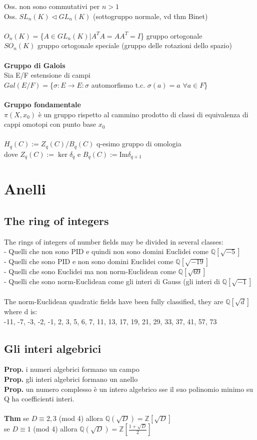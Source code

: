 \documentclass[10pt,a4paper]{article}
\begin{document}
Oss. non sono commutativi per $n>1$\\
Oss. $SL_n(K) \lhd GL_n(K)$ (sottogruppo normale, vd thm Binet)\\\\
$ O_n(K) = $\{$A \in GL_n(K) | A^TA = AA^T = I$\} gruppo ortogonale\\
$SO_n(K)$ gruppo ortogonale speciale (gruppo delle rotazioni dello spazio)\\\\
\textbf{Gruppo di Galois}\\
Sia E/F estensione di campi\\
$Gal(E/F) =$\{$\sigma: E \to E : \sigma$ automorfismo t.c. $\sigma(a) = a$ $ \forall a\in F$\}\\\\
\textbf{Gruppo fondamentale}\\
$\pi(X,x_0)$ è un gruppo rispetto al cammino prodotto di classi di equivalenza di cappi omotopi con punto base $x_0$\\\\
$H_q(C) := Z_q(C) / B_q(C)$ q-esimo gruppo di omologia\\
dove $Z_q(C) := \ker \delta_q $ e $ B_q(C) := $Im$\delta_{q+1}$
\newpage
\section{Anelli}
\subsection{The ring of integers}
The rings of integers of number fields may be divided in several classes:\\
- Quelli che non sono PID e quindi non sono domini Euclidei come $\mathbb{Q}[\sqrt{-5}]$\\
- Quelli che sono PID e non sono domini Euclidei come $\mathbb{Q}[\sqrt{-19}]$\\
- Quelli che sono Euclidei ma non norm-Euclidean come $\mathbb{Q}[\sqrt{69}]$\\
- Quelli che sono norm-Euclidean come gli interi di Gauss (gli interi di $\mathbb{Q}[\sqrt{-1}]$\\\\
The norm-Euclidean quadratic fields have been fully classified, they are $\mathbb{Q}[\sqrt{d}]$ where d is:\\
-11, -7, -3, -2, -1, 2, 3, 5, 6, 7, 11, 13, 17, 19, 21, 29, 33, 37, 41, 57, 73
\subsection{Gli interi algebrici}
\textbf{Prop.} i numeri algebrici formano un campo\\
\textbf{Prop.} gli interi algebrici formano un anello\\
\textbf{Prop.} un numero complesso è un intero algebrico sse il suo polinomio minimo su Q ha coefficienti interi.\\\\
\textbf{Thm} se $D \equiv 2,3$ (mod 4) allora $\mathbb{Q}(\sqrt D) = \mathbb{Z}[\sqrt D]$\\
se $D \equiv 1$ (mod 4) allora $\mathbb{Q}(\sqrt D) = \mathbb{Z}[\frac{1+ \sqrt D}{2}]$
%
%
\end{document}
